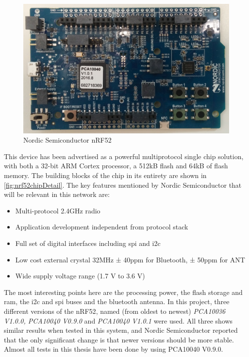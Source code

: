 \begin{figure}[ht]
    \centering
    \includegraphics[width=1.0\textwidth]{nRF522.png}    
    \caption{Nordic Semiconductor nRF52 }
    \label{fig:nrf52picture}
\end{figure}


\noindent This device has been advertised as a powerful multiprotocol single chip solution, with both a 32-bit ARM Cortex processor, a 512kB flash and 64kB of flash memory. The building blocks of the chip in its entirety are shown in \ref{fig:nrf52chipDetail}. The key features mentioned by Nordic Semiconductor \cite{nrf52Nordic} that will be relevant in this network are: 

\begin{itemize}
	\item Multi-protocol 2.4GHz radio
	\item Application development independent from protocol stack
	\item Full set of digital interfaces including \gls{spi} and \gls{i2c}
	\item Low cost external crystal 32MHz ± 40ppm for Bluetooth, ± 50ppm for ANT
	\item Wide supply voltage range (1.7 V to 3.6 V)
\end{itemize}


\noindent The most interesting points here are the processing power, the flash storage and \gls{ram}, the \gls{i2c} and \gls{spi} buses and the bluetooth antenna. In this project, three different versions of the \gls{nRF52}, named (from oldest to newest) \textit{PCA10036 V1.0.0, PCA10040 V0.9.0} and \textit{PCA10040 V1.0.1} were used. All three shows similar results when tested in this system, and Nordic Semiconductor reported that the only significant change is that newer versions should be more stable. Almost all tests in this thesis have been done by using PCA10040 V0.9.0. 

